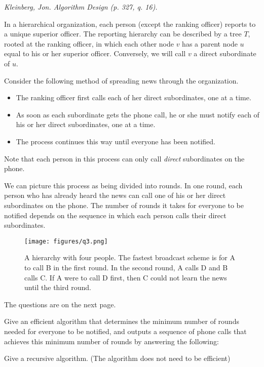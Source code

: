 \documentclass[solutionbox,answers]{exam}
\begin{document}
\begin{questions}

\question \textit{Kleinberg, Jon. Algorithm Design (p. 327, q. 16).} 

In a hierarchical organization, each person (except the ranking officer) reports to a unique superior officer. The reporting hierarchy can be described by a tree $T$, rooted at the ranking officer, in which each other node $v$ has a parent node $u$ equal to his or her superior officer. Conversely, we will call $v$ a direct subordinate of $u$. 

Consider the following method of spreading news through the organization. 
\begin{itemize}
\item The ranking officer first calls each of her direct subordinates, one at a time. 
\item As soon as each subordinate gets the phone call, he or she must notify each of his or her direct subordinates, one at a time. 
\item The process continues this way until everyone has been notified. 
\end{itemize}

Note that each person in this process can only call \textit{direct} subordinates on the phone. 

We can picture this process as being divided into rounds. In one round, each person who has already heard the news can call one of his or her direct subordinates on the phone. The number of rounds it takes for everyone to be notified depends on the sequence in which each person calls their direct subordinates.

\begin{SCfigure}[50][h]
    \texttt{[image: figures/q3.png]}
    \caption{A hierarchy with four people. The fastest broadcast scheme is for A to call B in the first round. In the second round, A calls D and B calls C. If A were to call D first, then C could not learn the news until the third round.}
    \label{fig:q3}
\end{SCfigure}

The questions are on the next page. 
\newpage

Give an efficient algorithm that determines the minimum number of rounds needed for everyone to be notified, and outputs a sequence of phone calls that achieves this minimum number of rounds by answering the following: 
\begin{parts}
\item Give a recursive algorithm. (The algorithm does not need to be efficient)
\begin{solutionbox}{} \vspace{1em} 


\end{solutionbox}
\end{parts}
\end{questions}
\end{document}
